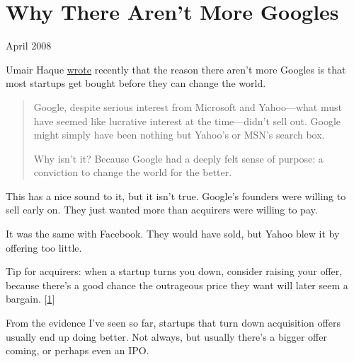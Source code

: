 \chapter{Why There Aren't More Googles}


            
              
                


                  
                    April 2008

Umair Haque
                    \href{http://discussionleader.hbsp.com/haque/2008/04/i\_agree\_and\_i.html}{wrote}
                    recently that the reason there aren't more Googles is that
                    most startups get bought before they can change the world.
                  


                  \begin{quote}

                    Google, despite serious interest from Microsoft and
                    Yahoo---what must have seemed like lucrative interest at
                    the time---didn't sell out. Google might simply have
                    been nothing but Yahoo's or MSN's search box.

Why
                    isn't it? Because Google had a deeply felt sense of purpose:
                    a conviction to change the world for the better.
                  
\end{quote}

                  This has a nice sound to it, but it isn't true. Google's
                  founders were willing to sell early on. They just wanted more
                  than acquirers were willing to pay.

It was the same
                  with Facebook. They would have sold, but Yahoo blew it by
                  offering too little.

Tip for acquirers: when a
                  startup turns you down, consider raising your offer, because
                  there's a good chance the outrageous price they want will
                  later seem a bargain.
                  [\href{\#f1n}{1}]

From the evidence I've seen so far, startups that
                  turn down acquisition offers usually end up doing better. Not
                  always, but usually there's a bigger offer coming, or perhaps
                  even an IPO.

